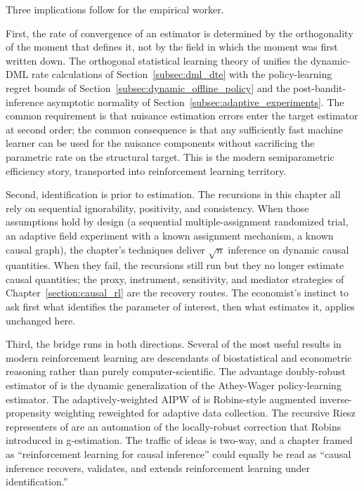 Three implications follow for the empirical worker.

First, the rate of convergence of an estimator is determined by the orthogonality of the moment that defines it, not by the field in which the moment was first written down. The orthogonal statistical learning theory of \citet{fosterSyrgkanis2023orthogonal} unifies the dynamic-DML rate calculations of Section~\ref{subsec:dml_dte} with the policy-learning regret bounds of Section~\ref{subsec:dynamic_offline_policy} and the post-bandit-inference asymptotic normality of Section~\ref{subsec:adaptive_experiments}. The common requirement is that nuisance estimation errors enter the target estimator at second order; the common consequence is that any sufficiently fast machine learner can be used for the nuisance components without sacrificing the parametric rate on the structural target. This is the modern semiparametric efficiency story, transported into reinforcement learning territory.

Second, identification is prior to estimation. The recursions in this chapter all rely on sequential ignorability, positivity, and consistency. When those assumptions hold by design (a sequential multiple-assignment randomized trial, an adaptive field experiment with a known assignment mechanism, a known causal graph), the chapter's techniques deliver $\sqrt n$ inference on dynamic causal quantities. When they fail, the recursions still run but they no longer estimate causal quantities; the proxy, instrument, sensitivity, and mediator strategies of Chapter~\ref{section:causal_rl} are the recovery routes. The economist's instinct to ask first what identifies the parameter of interest, then what estimates it, applies unchanged here.

Third, the bridge runs in both directions. Several of the most useful results in modern reinforcement learning are descendants of biostatistical and econometric reasoning rather than purely computer-scientific. The advantage doubly-robust estimator of \citet{nie2021whentotreat} is the dynamic generalization of the Athey-Wager policy-learning estimator. The adaptively-weighted AIPW of \citet{hadad2021adaptive} is Robins-style augmented inverse-propensity weighting reweighted for adaptive data collection. The recursive Riesz representers of \citet{chernozhukov2023automatic} are an automation of the locally-robust correction that Robins introduced in g-estimation. The traffic of ideas is two-way, and a chapter framed as ``reinforcement learning for causal inference'' could equally be read as ``causal inference recovers, validates, and extends reinforcement learning under identification.''

